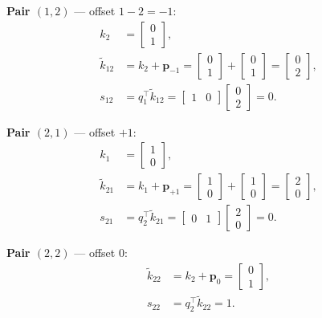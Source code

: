 \documentclass[11pt]{article}
\begin{document}
\textbf{Pair \((1,2)\)} --- offset \(1-2=-1\):
\begin{align*}
  k_2 &= \begin{bmatrix}0\\1\end{bmatrix}, \\
  \tilde{k}_{12}
    &= k_2 + \mathbf{p}_{-1}
     = \begin{bmatrix}0\\1\end{bmatrix}+\begin{bmatrix}0\\1\end{bmatrix}
     = \begin{bmatrix}0\\2\end{bmatrix}, \\
  s_{12}
    &= q_1^\top \tilde{k}_{12}
     = \begin{bmatrix}1&0\end{bmatrix}\begin{bmatrix}0\\2\end{bmatrix}
     = 0.
\end{align*}

\textbf{Pair \((2,1)\)} --- offset \(+1\):
\begin{align*}
  k_1 &= \begin{bmatrix}1\\0\end{bmatrix}, \\
  \tilde{k}_{21}
    &= k_1 + \mathbf{p}_{+1}
     = \begin{bmatrix}1\\0\end{bmatrix}+\begin{bmatrix}1\\0\end{bmatrix}
     = \begin{bmatrix}2\\0\end{bmatrix}, \\
  s_{21}
    &= q_2^\top \tilde{k}_{21}
     = \begin{bmatrix}0&1\end{bmatrix}\begin{bmatrix}2\\0\end{bmatrix}
     = 0.
\end{align*}

\textbf{Pair \((2,2)\)} --- offset \(0\):
\begin{align*}
  \tilde{k}_{22}
    &= k_2 + \mathbf{p}_{0}
     = \begin{bmatrix}0\\1\end{bmatrix}, \\
  s_{22}
    &= q_2^\top \tilde{k}_{22}
     = 1.
\end{align*}
\end{document}
